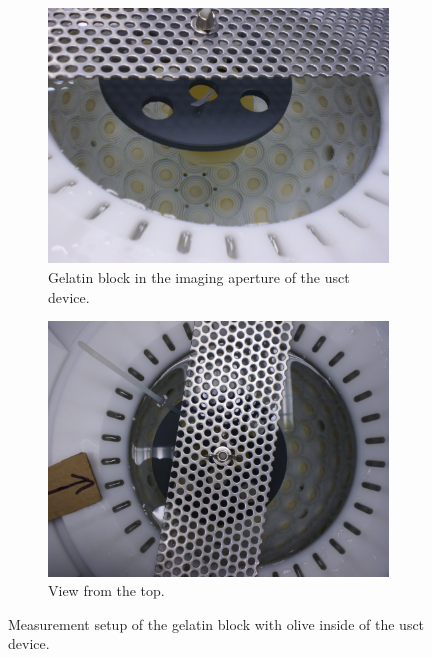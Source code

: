 \begin{figure}[H]
     \centering
     \begin{subfigure}[b]{0.49\textwidth}
         \centering
         \includegraphics[width=0.99\textwidth]{Graphics/gelatin_setup1.JPG}
         \caption{Gelatin block in the imaging aperture of the \ac{usct} device.}
         \label{fig:gelatine_setup_2}
     \end{subfigure}
     \hfill
     \begin{subfigure}[b]{0.49\textwidth}
         \centering
         \includegraphics[width=0.99\textwidth]{Graphics/gelatin_setup 2.JPG}
         \caption{View from the top.}
         \label{fig:gelatine_setup_1}
     \end{subfigure}
        \caption{Measurement setup of the gelatin block with olive inside of the \ac{usct} device.}
        \label{fig:gelatine_setup}
\end{figure}


